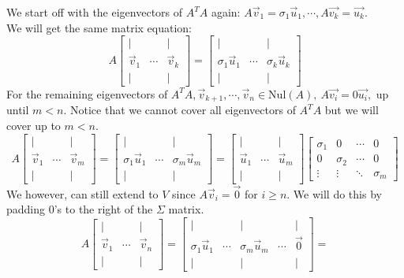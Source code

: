 \begin{enumerate}
{    We start off with the eigenvectors of $A^{T} A$ again: $A \vec{v}_{1} = \sigma_{1} \vec{u}_{1}, \cdots, A \vec{v_k} = \vec{u_k}.$ \\
    We will get the same matrix equation:
    $$A \begin{bmatrix} | & \ & | \\
    \vec{v}_{1} & \cdots & \vec{v}_{k}  \\ | & \ & | \end{bmatrix} 
    =  \begin{bmatrix} | & \ & | \\ \sigma_{1} \vec{u}_{1} & \cdots & \sigma_{k} \vec{u}_{k} \\ | & \ & | \end{bmatrix}$$
    For the remaining eigenvectors of $A^{T}A, \vec{v}_{k + 1}, \cdots, \vec{v}_{n} \in \text{Nul}(A), \ A \vec{v_{i}} = 0 \vec{u_{i}},$ up until $m < n.$ Notice that we cannot cover all eigenvectors of $A^{T} A$ but we will cover up to $m < n.$
    $$A \begin{bmatrix} | & \ & | \\
    \vec{v}_{1} & \cdots & \vec{v}_{m}  \\ | & \ & | \end{bmatrix} = 
    \begin{bmatrix} | & \ & | \\ \sigma_{1} \vec{u}_{1} & \cdots & \sigma_{m} \vec{u}_{m} \\ | & \ & | \end{bmatrix} = 
     \begin{bmatrix} | & \ & | \\ \vec{u}_{1} & \cdots & \vec{u}_{m} \\ | & \ & | \end{bmatrix} \begin{bmatrix} \sigma_{1} & 0 &  \cdots & 0 \\ 0 & \sigma_{2} & \cdots & 0 \\ \vdots & \vdots & \ddots & \sigma_{m} \end{bmatrix}$$
    We however, can still extend to $V$ since $A \vec{v}_{i} = \vec{0}$ for $i \geq n.$ We will do this by padding $0$'s to the right of the $\Sigma$ matrix.
    $$A \begin{bmatrix} | & \ & | \\
    \vec{v}_{1} & \cdots & \vec{v}_{n}  \\ | & \ & | \end{bmatrix} = 
    \begin{bmatrix} | & \ & | &  & | \\ \sigma_{1} \vec{u}_{1} & \cdots & \sigma_{m} \vec{u}_{m} & \cdots & \vec{0} \\ | & \ & | &  & | \end{bmatrix} = 
$$}
\end{enumerate}
